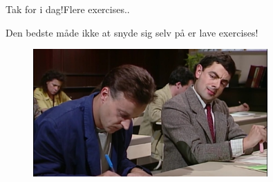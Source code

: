 \documentclass[aspectratio=1610]{beamer}
\begin{document}
\begin{frame}{Tak for i dag!}{Flere exercises..}

    Den bedste måde ikke at snyde sig selv på er lave exercises!

    \begin{figure}[h]
        \centering
        \includegraphics[width=0.8\textwidth]{exercises}
    \end{figure}
    
\end{frame}
\end{document}
